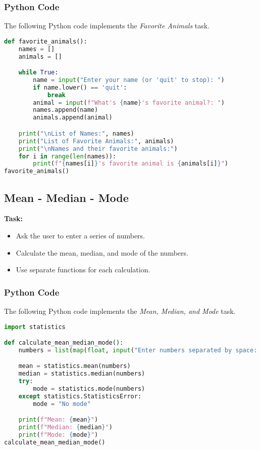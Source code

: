 \documentclass{article}
\begin{document}
\subsubsection{Python Code}
The following Python code implements the \textit{Favorite Animals} task.

\begin{lstlisting}[language=python]
def favorite_animals():
    names = []
    animals = []

    while True:
        name = input("Enter your name (or 'quit' to stop): ")
        if name.lower() == 'quit':
            break
        animal = input(f"What's {name}'s favorite animal?: ")
        names.append(name)
        animals.append(animal)

    print("\nList of Names:", names)
    print("List of Favorite Animals:", animals)
    print("\nNames and their favorite animals:")
    for i in range(len(names)):
        print(f"{names[i]}'s favorite animal is {animals[i]}")
favorite_animals()        
\end{lstlisting}
\newpage
\subsection{Mean - Median - Mode}
\textbf{Task:}
\begin{itemize}
    \item Ask the user to enter a series of numbers.
    \item Calculate the mean, median, and mode of the numbers.
    \item Use separate functions for each calculation.
\end{itemize}

\subsubsection{Python Code}
The following Python code implements the \textit{Mean, Median, and Mode} task.

\begin{lstlisting}[language=python]
import statistics

def calculate_mean_median_mode():
    numbers = list(map(float, input("Enter numbers separated by space: ").split()))

    mean = statistics.mean(numbers)
    median = statistics.median(numbers)
    try:
        mode = statistics.mode(numbers)
    except statistics.StatisticsError:
        mode = "No mode"

    print(f"Mean: {mean}")
    print(f"Median: {median}")
    print(f"Mode: {mode}")
calculate_mean_median_mode()    
\end{lstlisting}
\end{document}
